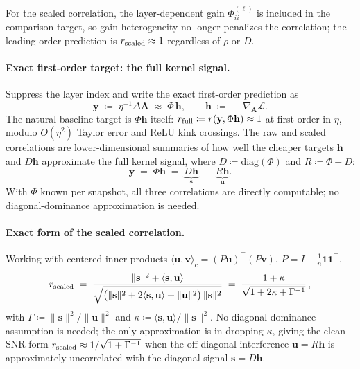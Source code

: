 \documentclass[10pt]{article}
\newcommand{\vA}{\mathbf{A}}
\newcommand{\vy}{\mathbf{y}}
\newcommand{\vh}{\mathbf{h}}
\newcommand{\vs}{\mathbf{s}}
\newcommand{\vu}{\mathbf{u}}
\newcommand{\vv}{\mathbf{v}}
\newcommand{\loss}{\mathcal{L}}
\begin{document}
For the scaled correlation, the layer-dependent gain $\Phi^{(\ell)}_{ii}$ is included in the comparison target, so gain heterogeneity no longer penalizes the correlation; the leading-order prediction is $r_{\rm scaled}\approx 1$ regardless of $\rho$ or $D$.

\paragraph{Exact first-order target: the full kernel signal.}
Suppress the layer index and write the exact first-order prediction as
\[
  \vy \;\coloneqq\; \eta^{-1}\Delta\vA \;\approx\; \Phi\,\vh,
  \qquad \vh \;\coloneqq\; -\nabla_{\!\vA}\loss.
\]
The natural baseline target is $\Phi\vh$ itself: $r_{\rm full}\coloneqq r(\vy,\Phi\vh)\approx 1$ at first order in $\eta$, modulo $O(\eta^2)$ Taylor error and ReLU kink crossings.  The raw and scaled correlations are lower-dimensional summaries of how well the cheaper targets $\vh$ and $D\vh$ approximate the full kernel signal, where $D\coloneqq\mathrm{diag}(\Phi)$ and $R\coloneqq\Phi-D$:
\[
  \vy \;=\; \Phi\vh \;=\; \underbrace{D\vh}_{\vs} \;+\; \underbrace{R\vh}_{\vu}.
\]
With $\Phi$ known per snapshot, all three correlations are directly computable; no diagonal-dominance approximation is needed.

\paragraph{Exact form of the scaled correlation.}
Working with centered inner products $\langle\vu,\vv\rangle_c=(P\vu)^{\!\top}(P\vv)$, $P=I-\tfrac{1}{n}\mathbf{1}\mathbf{1}^{\!\top}$,
\begin{equation}\label{eq:snr}
  r_{\rm scaled}
  \;=\;
  \frac{\lVert\vs\rVert^2 + \langle\vs,\vu\rangle}
       {\sqrt{\bigl(\lVert\vs\rVert^2 + 2\langle\vs,\vu\rangle + \lVert\vu\rVert^2\bigr)\,\lVert\vs\rVert^2}}
  \;=\;
  \frac{1+\kappa}{\sqrt{1+2\kappa+\Gamma^{-1}}}\,,
\end{equation}
with $\Gamma\coloneqq\lVert\vs\rVert^2/\lVert\vu\rVert^2$ and $\kappa\coloneqq\langle\vs,\vu\rangle/\lVert\vs\rVert^2$.  No diagonal-dominance assumption is needed; the only approximation is in dropping $\kappa$, giving the clean SNR form $r_{\rm scaled}\approx 1/\sqrt{1+\Gamma^{-1}}$ when the off-diagonal interference $\vu=R\vh$ is approximately uncorrelated with the diagonal signal $\vs=D\vh$.
\end{document}
